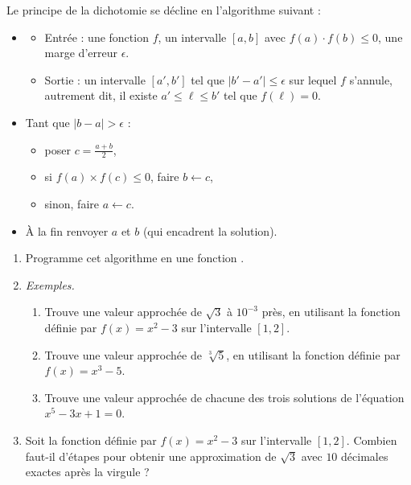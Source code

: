 \documentclass[11pt,class=report,crop=false]{standalone}
\begin{document}
\begin{activite}[Dichotomie]


Le principe de la dichotomie se décline en l'algorithme suivant :
\begin{algorithme}
  \sauteligne 
 \begin{itemize}
   \item 
   \begin{itemize} 
       \item Entrée : une fonction $f$, un intervalle $[a,b]$ avec $f(a)\cdot f(b) \le 0$, une marge d'erreur $\epsilon$.
       \item Sortie : un intervalle $[a',b']$ tel que $|b'-a'| \le \epsilon$ sur lequel $f$ s'annule, autrement dit, il existe $a' \le \ell \le b'$ tel que $f(\ell)=0$.
     \end{itemize}
    
 
  \item Tant que $|b-a| > \epsilon$ :
   \begin{itemize}
     \item poser $c = \frac{a+b}{2}$,
     \item si $f(a) \times f(c) \le 0$, faire $b \leftarrow c$, %
     \item sinon, faire $a \leftarrow c$. %
     \end{itemize}   
     
     
   \item \`A la fin renvoyer $a$ et $b$ (qui encadrent la solution).
 \end{itemize}  
 \end{algorithme}



\begin{enumerate}
  \item Programme cet algorithme en une fonction .
  
  \item \emph{Exemples.} 
  \begin{enumerate}
   \item Trouve une valeur approchée de $\sqrt{3}$ à $10^{-3}$ près, en utilisant la fonction définie par $f(x) = x^2-3$ sur l'intervalle $[1,2]$.
    \item Trouve une valeur approchée de $\sqrt[3]{5}$, en utilisant la fonction définie par $f(x) = x^3-5$.
    \item Trouve une valeur approchée de chacune des trois solutions de l'équation $x^5-3x+1=0$.  
  \end{enumerate}
  
  \item Soit la fonction définie par $f(x) = x^2-3$ sur l'intervalle $[1,2]$. Combien faut-il d'étapes pour obtenir une approximation de $\sqrt{3}$ avec $10$ décimales exactes après la virgule ?
  
\end{enumerate} 

\end{activite}
\end{document}
